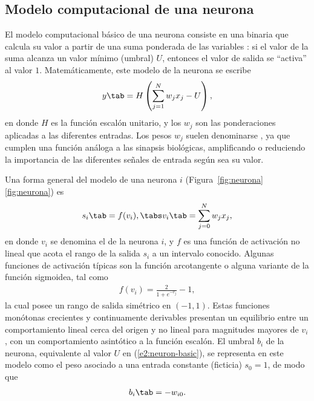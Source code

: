 %
%
\subsection{Modelo computacional de una neurona}
%
El modelo computacional básico de una neurona \cite{mlp1} consiste en
una  binaria que calcula su valor  a partir de una suma ponderada de las variables :
si el valor de la suma alcanza un valor mínimo (umbral) $U$, entonces
el valor de salida se ``activa'' al valor $1$.
Matemáticamente, este modelo de la neurona se escribe
%
\begin{align}\label{e2:neuron-basic}
  y \tab = H\left( \sum_{j=1}^{N} w_j x_j - U\right),
\end{align}
%
en donde $H$ es la función escalón unitario, y los  $w_j$ son
las ponderaciones aplicadas a las diferentes entradas.
Los pesos $w_j$ suelen denominarse , ya que
cumplen una función análoga a las sinapsis biológicas, amplificando o
reduciendo la importancia de las diferentes señales de entrada según
sea su valor.


Una forma general del modelo de una neurona $i$
(\iflatexml{}Figura~\ref{fig:neurona}\else\autoref{fig:neurona}\fi) es
%
\begin{align}\label{e2:neuron-general}
  s_i \tab = f(v_i), \tabs v_i \tab = \sum_{j=0}^N w_j x_j,
\end{align}
%
en donde $v_i$ se denomina el  de la neurona
$i$, y $f$ es una función de activación no lineal que acota el rango
de la salida $s_i$ a un intervalo conocido. Algunas funciones de
activación típicas son la función arcotangente o alguna variante de la
función sigmoidea, tal como
%
\begin{align}\label{e2:sigmoid-symmetric}
  f(v_i) = \frac{2}{1+e^{-v_j}}-1,
\end{align}
%
la cual posee un rango de salida simétrico en $(-1,1)$. Estas
funciones monótonas crecientes y continuamente derivables presentan un
equilibrio entre un comportamiento lineal cerca del origen y no lineal
para magnitudes mayores de $v_i$, con un comportamiento asintótico a
la función escalón.
El umbral $b_i$ de la neurona, equivalente al valor $U$ en
(\ref{e2:neuron-basic}), se representa en este modelo como el peso
asociado a una entrada constante (ficticia) $s_0=1$, de modo que
%
\begin{align}
  b_i\tab=-w_{i0}.
\end{align}
%
